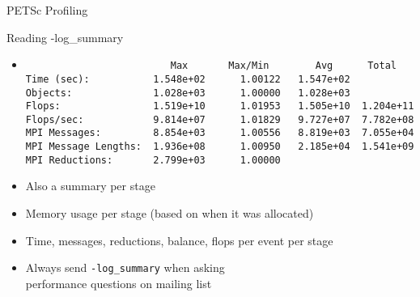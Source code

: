 \begin{frame}[fragile]{PETSc Profiling}

\begin{block}{Reading -log\_summary}
\begin{itemize}
\item
{\scriptsize
\begin{verbatim}
                         Max       Max/Min        Avg      Total 
Time (sec):           1.548e+02      1.00122   1.547e+02
Objects:              1.028e+03      1.00000   1.028e+03
Flops:                1.519e+10      1.01953   1.505e+10  1.204e+11
Flops/sec:            9.814e+07      1.01829   9.727e+07  7.782e+08
MPI Messages:         8.854e+03      1.00556   8.819e+03  7.055e+04
MPI Message Lengths:  1.936e+08      1.00950   2.185e+04  1.541e+09
MPI Reductions:       2.799e+03      1.00000
\end{verbatim}}
\item Also a summary per stage
\item Memory usage per stage (based on when it was allocated)
\item Time, messages, reductions, balance, flops per event per stage
\item Always send \lstinline|-log_summary| when asking \\
  performance questions on mailing list
\end{itemize}
\end{block}
\end{frame}

